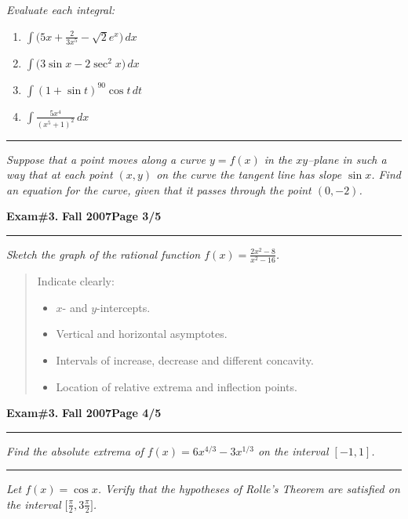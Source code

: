 \documentclass[12pt]{article}
\begin{document}
\bigskip
{\problem[20 pts] \em  Evaluate each integral:} 
\begin{enumerate}
\item $\displaystyle{\int \big( 5x + \frac{2}{3x^5} - \sqrt{2} e^x \big)\, dx}$
\vspace{2cm}
\item $\displaystyle{\int \big( 3\sin x - 2\sec^2 x \big)\, dx}$
\vspace{2cm}
\item $\displaystyle{\int ( 1 + \sin t)^{90} \cos t\, dt}$
\vspace{2cm}
\item $\displaystyle{\int \frac{5x^4}{(x^5+1)^2}\, dx}$
\vspace{3cm}
\end{enumerate}
\hrule
{\problem[10 pts] \em Suppose that a point moves along a curve $y=f(x)$ in the $xy$--plane in such a way that at each point $(x,y)$ on the curve the tangent line has slope $\sin x$.  Find an equation for the curve, given that it passes through the point $(0,-2)$.}
\newpage

\hfill{\large\bf Exam\#3.}\hfill{\large\bf
  Fall 2007}\hfill{\large\bf Page 3/5}\hrule

\bigskip
{\problem[30 pts] \em Sketch the graph of the rational function $f(x) = \displaystyle{\frac{2x^2-8}{x^2-16}}$.}
\begin{quotation}
Indicate clearly:
\begin{itemize}
\item $x$- and $y$-intercepts.
\item Vertical and horizontal asymptotes.
\item Intervals of increase, decrease and different concavity.
\item Location of relative extrema and inflection points. 
\end{itemize}
\end{quotation}
\newpage

\hfill{\large\bf Exam\#3.}\hfill{\large\bf
  Fall 2007}\hfill{\large\bf Page 4/5}\hrule

\bigskip
{\problem[10 pts] \em Find the absolute extrema of $f(x) = 6x^{4/3} - 3x^{1/3}$ on the interval $[-1,1]$.}
\vspace{9cm}
\begin{flushright}
\end{flushright}
\hrule
{\problem[10 pts] \em Let $f(x) = \cos x$. Verify that the hypotheses of Rolle's Theorem are satisfied on the interval $\big[\tfrac{\pi}{2}, 3\tfrac{\pi}{2}\big]$.}
\newpage
\end{document}
